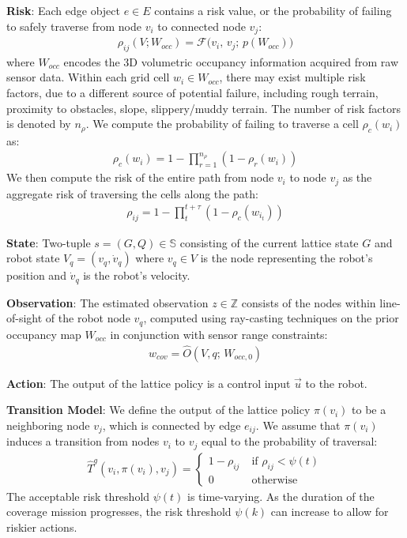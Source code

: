 \documentclass{article}
\newcommand{\ph}[1]{{\textbf{#1}:}} %
\begin{document}
\ph{Risk} Each edge object $e \in E$ contains a risk value, or the probability of failing to safely traverse from node $v_i$ to connected node $v_j$:
\begin{align}
    \rho_{ij}(V; W_{occ}) = \mathcal{F} \big(v_i, \, v_j; \, p(W_{occ})\big)
\end{align}
where $W_{occ}$ encodes the 3D volumetric occupancy information acquired from raw sensor data. Within each grid cell $w_i \in W_{occ}$, there may exist multiple risk factors, due to a different source of potential failure, including rough terrain, proximity to obstacles, slope, slippery/muddy terrain. The number of risk factors is denoted by $n_\rho$. We compute the probability of failing to traverse a cell $\rho_c(w_i)$ as:
\begin{align}
    \rho_c(w_i) = 1-\prod_{r=1}^{n_\rho} (1-\rho_r(w_i))
\end{align}
We then compute the risk of the entire path from node $v_i$ to node $v_j$ as the aggregate risk of traversing the cells along the path:
\begin{align}
    \rho_{ij} = 1-\prod_t^{t+\tau}(1-\rho_c(w_{i_t}))
\end{align}


\ph{State} Two-tuple $s=(G, Q)  \in \mathbb{S}$ consisting of the current lattice state $G$ and robot state $V_q = (v_q, \dot{v}_q)$ where $v_q \in V$ is the node representing the robot's position and $\dot{v}_q$ is the robot's velocity. 

\ph{Observation} The estimated observation $z \in \mathbb{Z}$ consists of the nodes within line-of-sight of the robot node $v_q$, computed using ray-casting techniques on the prior occupancy map $W_{occ}$ in conjunction with sensor range constraints:
\begin{align}
    w_{cov} = \hat{O}(V, q; \, W_{occ,0}) 
\end{align}

\ph{Action} The output of the lattice policy is a control input $\vec{u}$ to the robot. 

\ph{Transition Model} We define the output of the lattice policy $\pi(v_i)$ to be a neighboring node $v_j$, which is connected by edge $e_{ij}$. We assume that $\pi(v_i)$ induces a transition from nodes $v_i$ to $v_j$ equal to the probability of traversal:
\begin{align}
    \hat{T}^{g} (v_i, \pi(v_i), v_j) = \begin{cases} 
    1-\rho_{ij} \; &\text{if $\rho_{ij} < \psi(t)$}\\
    0 \; &\text{otherwise}
    \end{cases}
\end{align}
The acceptable risk threshold $\psi(t)$ is time-varying. As the duration of the coverage mission progresses, the risk threshold $\psi(k)$ can increase to allow for riskier actions.
\end{document}
